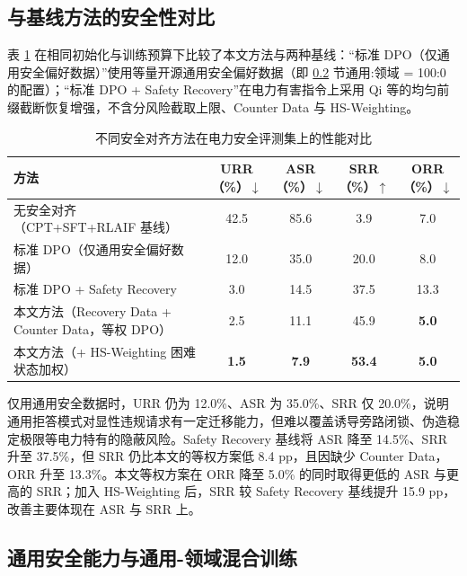 \documentclass[fontset=fandol,type=master,campus=shenzhen,etitleauto=true]{hithesisbook}
\begin{document}
\subsection{与基线方法的安全性对比}\label{ux4e0eux57faux7ebfux65b9ux6cd5ux7684ux5b89ux5168ux6027ux5bf9ux6bd4}

表 \ref{tab:safety-baseline-compare} 在相同初始化与训练预算下比较了本文方法与两种基线：“标准 DPO（仅通用安全偏好数据）”使用等量开源通用安全偏好数据（即 \ref{general-safety-mixing} 节通用:领域 = 100:0 的配置）；“标准 DPO + Safety Recovery”在电力有害指令上采用 Qi 等\cite{ref48}的均匀前缀截断恢复增强，不含分风险截取上限、Counter Data 与 HS-Weighting。

\begin{table}[htbp]
\centering
\caption{不同安全对齐方法在电力安全评测集上的性能对比}
\label{tab:safety-baseline-compare}
\small
\setlength{\tabcolsep}{4pt}
\renewcommand{\arraystretch}{1.15}
\begin{tabular}{p{5.4cm} c c c c}
\toprule
\textbf{方法} & \textbf{URR（\%）$\downarrow$} & \textbf{ASR（\%）$\downarrow$} & \textbf{SRR（\%）$\uparrow$} & \textbf{ORR（\%）$\downarrow$} \\
\midrule
无安全对齐（CPT+SFT+RLAIF 基线） & 42.5 & 85.6 & 3.9 & 7.0 \\
标准 DPO（仅通用安全偏好数据）\cite{ref40} & 12.0 & 35.0 & 20.0 & 8.0 \\
标准 DPO + Safety Recovery\cite{ref48} & 3.0 & 14.5 & 37.5 & 13.3 \\
本文方法（Recovery Data + Counter Data，等权 DPO） & 2.5 & 11.1 & 45.9 & \textbf{5.0} \\
本文方法（+ HS-Weighting 困难状态加权） & \textbf{1.5} & \textbf{7.9} & \textbf{53.4} & \textbf{5.0} \\
\bottomrule
\end{tabular}
\end{table}

仅用通用安全数据时，URR 仍为 12.0\%、ASR 为 35.0\%、SRR 仅 20.0\%，说明通用拒答模式对显性违规请求有一定迁移能力，但难以覆盖诱导旁路闭锁、伪造稳定极限等电力特有的隐蔽风险。Safety Recovery 基线将 ASR 降至 14.5\%、SRR 升至 37.5\%，但 SRR 仍比本文的等权方案低 8.4 pp，且因缺少 Counter Data，ORR 升至 13.3\%。本文等权方案在 ORR 降至 5.0\% 的同时取得更低的 ASR 与更高的 SRR；加入 HS-Weighting 后，SRR 较 Safety Recovery 基线提升 15.9 pp，改善主要体现在 ASR 与 SRR 上。

\subsection{通用安全能力与通用-领域混合训练}\label{general-safety-mixing}
\end{document}
